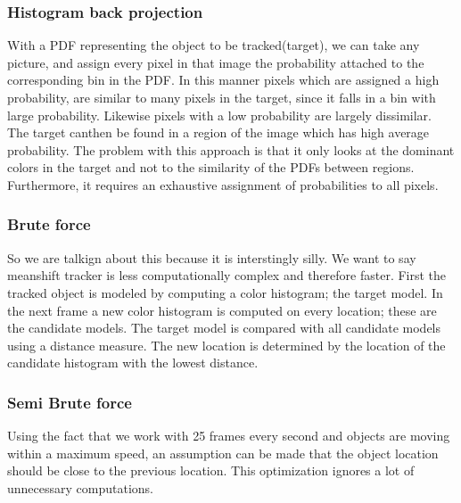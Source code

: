 \documentclass[a4paper,11pt]{article}
\begin{document}
\subsubsection{Histogram back projection}
With a PDF representing the object to be tracked(target), we can take any picture, and assign every pixel in that image the probability attached to the corresponding bin in the PDF. In this manner pixels which are assigned a high probability, are similar to many pixels in the target, since it falls in a bin with large probability. Likewise pixels with a low probability are largely dissimilar. The target canthen be found in a region of the image which has high average probability. The problem with this approach is that it only looks at the dominant colors in the target and not to the similarity of the PDFs between regions. Furthermore, it requires an exhaustive assignment of probabilities to all pixels.

\subsubsection{Brute force}
So we are talkign about this because it is interstingly silly. We want to say meanshift tracker is less computationally complex and therefore faster. 
First the tracked object is modeled by computing a color histogram; the target model. In the next frame a new color histogram is computed on every location; these are the candidate models. The target model is compared with all candidate models using a distance measure. The new location is determined by the location of the candidate histogram with the lowest distance.
		
\subsubsection{Semi Brute force}
Using the fact that we work with 25 frames every second and objects are moving within a maximum speed, an assumption can be made that the object location should be close to the previous location. This optimization ignores a lot of unnecessary computations.

	

	


\end{document}
